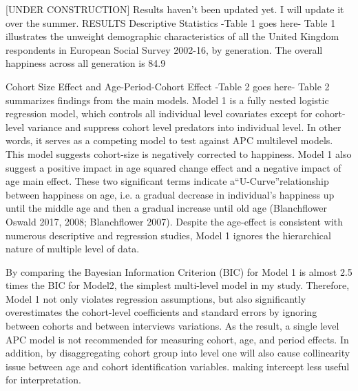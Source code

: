 [UNDER CONSTRUCTION]
Results haven’t been updated yet. I will update it over the summer.
RESULTS
Descriptive Statistics
-Table 1 goes here-
Table 1 illustrates the unweight demographic characteristics of all the United Kingdom respondents in European Social Survey 2002-16, by generation. The overall happiness across all generation is 84.9%

Cohort Size Effect and Age-Period-Cohort Effect
-Table 2 goes here-
Table 2 summarizes findings from the main models. Model 1 is a fully nested logistic regression model, which controls all individual level covariates except for cohort-level variance and suppress cohort level predators into individual level. In other words, it serves as a competing model to test against APC multilevel models. This model suggests cohort-size is negatively corrected to happiness. Model 1 also suggest a positive impact in age squared change effect and a negative impact of age main effect. These two significant terms indicate a“U-Curve”relationship between happiness on age, i.e. a gradual decrease in individual’s happiness up until the middle age and then a gradual increase until old age (Blanchflower Oswald 2017, 2008; Blanchflower 2007). Despite the age-effect is consistent with numerous descriptive and regression studies, Model 1 ignores the hierarchical nature of multiple level of data.

By comparing the Bayesian Information Criterion (BIC) for Model 1 is almost 2.5 times the BIC for Model2, the simplest multi-level model in my study. Therefore, Model 1 not only violates regression assumptions, but also significantly overestimates the cohort-level coefficients and standard errors by ignoring between cohorts and between interviews variations. As the result, a single level APC model is not recommended for measuring cohort, age, and period effects. In addition, by disaggregating cohort group into level one will also cause collinearity issue between age and cohort identification variables. making intercept less useful for interpretation.

